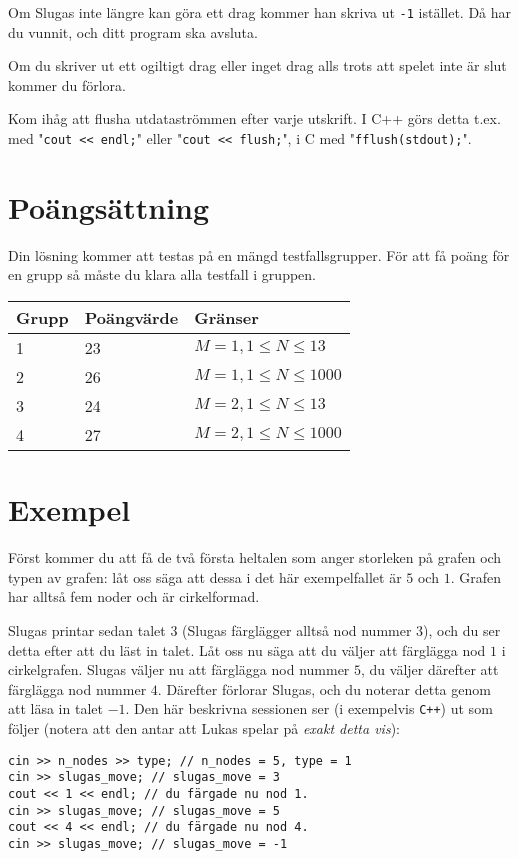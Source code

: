 Om Slugas inte längre kan göra ett drag kommer han skriva ut \texttt{-1} istället. Då har du vunnit, och ditt program ska avsluta.

Om du skriver ut ett ogiltigt drag eller inget drag alls trots att spelet inte är slut kommer du förlora.

Kom ihåg att flusha utdataströmmen efter varje utskrift. I C++ görs detta t.ex. med "\texttt{cout << endl;}" eller "\texttt{cout << flush;}", i C med "\texttt{fflush(stdout);}".

\section*{Poängsättning}
Din lösning kommer att testas på en mängd testfallsgrupper. För att få poäng för en grupp så måste du klara alla testfall i gruppen.

\begin{tabular}{| l | l | l |}
\hline
Grupp & Poängvärde & Gränser\\ \hline
1     & 23         & $ M=1, 1 \le N \le 13 $ \\ \hline
2     & 26         & $ M=1, 1 \le N \le 1000 $ \\ \hline
3     & 24         & $ M=2, 1 \le N \le 13 $ \\ \hline
4     & 27         & $ M=2, 1 \le N \le 1000 $ \\ \hline
\end{tabular}

\section*{Exempel}
Först kommer du att få de två första heltalen som anger storleken på grafen och
typen av grafen: låt oss säga att dessa i det här exempelfallet är $5$ och $1$.
Grafen har alltså fem noder och är cirkelformad.

Slugas printar sedan talet $3$ (Slugas färglägger alltså nod nummer $3$), och du ser
detta efter att du läst in talet. Låt oss nu säga att du väljer att färglägga
nod $1$ i cirkelgrafen. Slugas väljer nu att färglägga nod nummer $5$, du väljer därefter
att färglägga nod nummer $4$. Därefter förlorar Slugas, och du noterar detta
genom att läsa in talet $-1$. Den här beskrivna sessionen ser (i exempelvis
\texttt{C++}) ut som följer (notera att den antar att Lukas spelar på \emph{exakt detta vis}):

\texttt{cin >> n\_nodes >> type; // n\_nodes = 5, type = 1 }\\
\texttt{cin >> slugas\_move; // slugas\_move = 3 }\\
\texttt{cout << 1 << endl; // du färgade nu nod 1. }\\
\texttt{cin >> slugas\_move; // slugas\_move = 5 }\\
\texttt{cout << 4 << endl; // du färgade nu nod 4. }\\
\texttt{cin >> slugas\_move; // slugas\_move = -1 }

